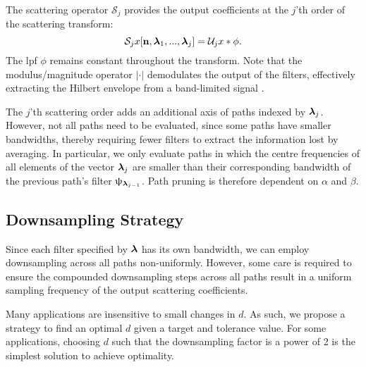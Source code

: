 The scattering operator $\mathcal{S}_j$ provides the output coefficients at the $j$'th order of the scattering transform:
\begin{equation}
    \mathcal{S}_j x[\boldsymbol{\mathbf{n}}, \boldsymbol{\mathbf{\lambda}}_1, ..., \boldsymbol{\mathbf{\lambda}}_j] = \mathcal{U}_j x * \phi.
\end{equation}
The \ac{lpf} $\phi$ remains constant throughout the transform. Note that the modulus/magnitude operator $|\cdot|$ demodulates the output of the filters, effectively extracting the Hilbert envelope from a band-limited signal \citep{waveletsandsubbandcoding}. 

The $j$'th scattering order adds an additional axis of paths indexed by $\boldsymbol{\mathbf{\lambda}}_j$. However, not all paths need to be evaluated, since some paths have smaller bandwidths, thereby requiring fewer filters to extract the information lost by averaging. In particular, we only evaluate paths in which the centre frequencies of all elements of the vector $\boldsymbol{\mathbf{\lambda}}_{j}$ are smaller than their corresponding bandwidth of the previous path's filter $\uppsi_{\boldsymbol{\mathbf{\lambda}}_{j-1}}$. Path pruning is therefore dependent on $\alpha$ and $\beta$.

\subsection{Downsampling Strategy}
Since each filter specified by $\boldsymbol{\mathbf{\lambda}}$ has its own bandwidth, we can employ downsampling across all paths non-uniformly. However, some care is required to ensure the compounded downsampling steps across all paths result in a uniform sampling frequency of the output scattering coefficients.



Many applications are insensitive to small changes in $d$. As such, we propose a strategy to find an optimal $d$ given a target and tolerance value. For some applications, choosing $d$ such that the downsampling factor is a power of 2 is the simplest solution to achieve optimality. 

